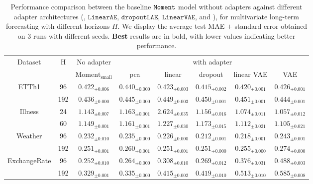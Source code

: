 \begin{table*}[ht]
    \centering
    \begin{tabular}[t]{cccccccc}
        \toprule[\thick pt]
        \multirow{2}{*}{Dataset} & \multirow{2}{*}{H} & \multicolumn{1}{c}{No adapter} & \multicolumn{5}{c}{with adapter} \\
        \cmidrule(lr){3-3} 
        \cmidrule(lr){4-8}
         & & $\text{Moment}_{\text{small}}$ & pca & linear & dropout & linear VAE & VAE \\
        \midrule[\thick pt]
        \multirow{2}{*}{ETTh1} & 96 & $0.422_{\pm 0.006}$ & $0.440_{\pm 0.000}$ & $0.423_{\pm 0.003}$ & $\mathbf{0.415_{\pm 0.002}}$ & $0.420_{\pm 0.001}$ & $0.426_{\pm 0.001}$ \\
         & 192  &  $\mathbf{0.436_{\pm 0.000}}$ & $0.445_{\pm 0.000}$ & $0.449_{\pm 0.003}$ & $0.450_{\pm 0.001}$ & $0.451_{\pm 0.001}$ & $0.444_{\pm 0.001}$  \\
        \cmidrule(lr){1-8}
        \multirow{2}{*}{Illness} & 24 & $1.143_{\pm 0.007}$ & $1.163_{\pm 0.001}$ & $2.624_{\pm 0.035}$ & $1.156_{\pm 0.016}$ & $1.074_{\pm 0.011}$ & $\mathbf{1.057_{\pm 0.012}}$ \\
         & 60  & $1.149_{\pm 0.001}$ & $1.161_{\pm 0.001}$ & $1.227_{\pm 0.030}$ & $1.173_{\pm 0.015}$ & $1.112_{\pm 0.021}$ & $\mathbf{1.105_{\pm 0.021}}$ \\
         \cmidrule(lr){1-8}
        \multirow{2}{*}{Weather} & 96 & $0.232_{\pm 0.010}$ & $0.235_{\pm 0.000}$ & $0.226_{\pm 0.000}$ & $0.212_{\pm 0.001}$ & $\mathbf{0.218_{\pm 0.001}}$ & $0.243_{\pm 0.001}$ \\
         & 192 & $\mathbf{0.251_{\pm 0.001}}$ & $0.260_{\pm 0.001}$ & $\mathbf{0.251_{\pm 0.001}}$ & $\mathbf{0.251_{\pm 0.000}}$ & $0.255_{\pm 0.000}$ & $0.274_{\pm 0.000}$ \\
        \cmidrule(lr){1-8}
        \multirow{2}{*}{ExchangeRate} & 96 & $\mathbf{0.252_{\pm 0.010}}$ & $0.264_{\pm 0.000}$ & $0.308_{\pm 0.010}$ & $0.269_{\pm 0.012}$ & $0.376_{\pm 0.031}$ & $0.488_{\pm 0.003}$ \\
         & 192 & $\mathbf{0.329_{\pm 0.001}}$ & $0.335_{\pm 0.000}$ & $0.415_{\pm 0.002}$ & $0.419_{\pm 0.010}$ & $0.513_{\pm 0.010}$ & $0.585_{\pm 0.008}$ \\
        \bottomrule[\thick pt]
    \end{tabular}
    \caption{Performance comparison between the baseline $\texttt{Moment}$ model without adapters against different adapter architectures (\pca, $\texttt{LinearAE}$, $\texttt{dropoutLAE}$, $\texttt{LinearVAE}$, and \vae), for multivariate long-term forecasting with different horizons $H$. We display the average test MAE $\pm$ standard error obtained on $3$ runs with different seeds. \textbf{Best} results are in bold, with lower values indicating better performance.}
    \label{table:results_mae}
\end{table*}

